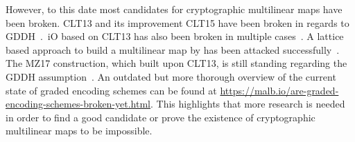 \documentclass[english]{scrartcl}
\theoremstyle{plain}
\theoremstyle{definition}
\begin{document}
    However, to this date most candidates for cryptographic multilinear maps have been broken. CLT13 and its improvement CLT15 have been broken in regards to GDDH~\cite{cryptoeprint:2014:906,cryptoeprint:2016:135}.\ iO based on CLT13 has also been broken in multiple cases~\cite{cryptoeprint:2019:1254,cryptoeprint:2019:309}.
    A lattice based approach to build a multilinear map by \citeauthor*{cryptoeprint:mm_gentry} has been attacked successfully~\cite*{cryptoeprint:ggh_attack}.
    The MZ17 construction, which built upon CLT13, is still standing regarding the GDDH assumption~\cite{cryptoeprint:2017:946}.
    An outdated but more thorough overview of the current state of graded encoding schemes can be found at \url{https://malb.io/are-graded-encoding-schemes-broken-yet.html}. This highlights that more research is needed in order to find a good candidate or prove the existence of cryptographic multilinear maps to be impossible.

    \printbibliography
\end{document}
